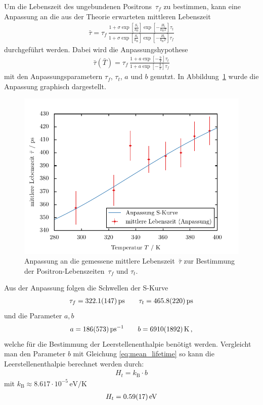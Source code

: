 \documentclass[11pt, a4paper]{article}
\numberwithin{equation}{section}
\begin{document}
Um die Lebenszeit des ungebundenen Positrons~$\tau_f$ zu bestimmen, kann eine Anpassung an die aus der Theorie erwarteten mittleren Lebenszeit 
\begin{align*}
	\bar{\tau} = \tau_f \, \frac{1 + \sigma \exp\left[ \frac{S_t}{k_\mathrm{B}} \right] \exp\left[ -\frac{H_t}{k_\mathrm{B} T} \right] \tau_t}{1 + \sigma \exp\left[ \frac{S_t}{k_\mathrm{B}} \right] \exp\left[ -\frac{H_t}{k_\mathrm{B} T} \right] \tau_f}
	\label{fig:mean_lifetime}
\end{align*}
durchgeführt werden.
Dabei wird die Anpassungshypothese
\begin{align*}
	\bar{\tau}(\bar{T}) = \tau_f \, \frac{1 + a \exp\left[ -\frac{b}{T} \right] \tau_t}{1 + a \exp\left[ -\frac{b}{T} \right] \tau_f}
\end{align*}
mit den Anpassungsparametern $\tau_f$, $\tau_t$, $a$ und $b$ genutzt.
In Abbildung~\ref{fig:s_curve} wurde die Anpassung graphisch dargestellt.
\begin{figure}[h]
	\centering
	\includegraphics{./figures/lifetime_s_curve.pdf}
	\caption{Anpassung an die gemessene mittlere Lebenszeit~$\bar{\tau}$ zur Bestimmung der Positron-Lebenszeiten~$\tau_f$ und $\tau_t$.}
	\label{fig:s_curve}
\end{figure}
Aus der Anpassung folgen die Schwellen der S-Kurve
\begin{align*}
	\tau_f = \SI{322.1 +- 14.7}{ps} \qquad	\tau_t = \SI{465.8 +- 22.0}{ps}
\end{align*}
und die Parameter $a, b$
\begin{align*}
	a = \SI{186 +- 573}{\per\pico\second} \qquad b = \SI{6910 +- 1892}{\kelvin} \, \text{,}
\end{align*}
welche für die Bestimmung der Leerstellenenthalpie benötigt werden.
Vergleicht man den Parameter $b$ mit Gleichung \eqref{eq:mean_lifetime} so kann die Leerstellenenthalpie berechnet werden durch:
\begin{align*}
	H_t = k_\mathrm{B} \cdot b
\end{align*}
mit $k_\mathrm{B} \approx \num{8.617} \cdot 10^{-5} \, \si{\eV\per\kelvin}$ \cite{codata}
\begin{align*}
	H_t = \SI{0.59 +- 0.17}{\electronvolt}
\end{align*}
\end{document}
